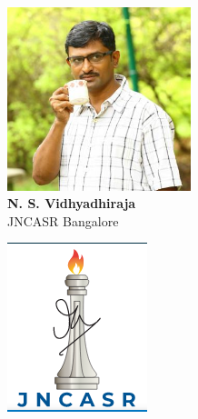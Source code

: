 \documentclass[aspectratio=169]{beamer}
\begin{document}
\begin{frame}{}
\begin{minipage}{0.3\textwidth}
	\centering
	\includegraphics[width=0.4\textwidth]{nsv.jpeg}\\
	\footnotesize{{\bf N. S. Vidhyadhiraja}\\
	JNCASR Bangalore}
\end{minipage}
\hspace*{\fill}
\begin{minipage}{0.1\textwidth}
	\includegraphics[width=\textwidth]{JNCASR.png}\\
\end{minipage}
\hspace*{\fill}

\end{frame}
\end{document}
